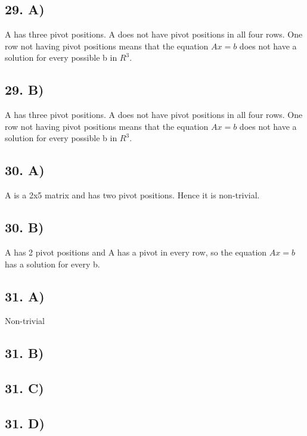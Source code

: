 \documentclass[12]{scrartcl}
\begin{document}
\subsection*{29. A)}
A has three pivot positions. A does not have pivot positions in all four rows. One row not having pivot positions means that the equation $Ax = b$ does not have a solution for every possible b in $R^3$.
\subsection*{29. B)}
A has three pivot positions. A does not have pivot positions in all four rows. One row not having pivot positions means that the equation $Ax = b$ does not have a solution for every possible b in $R^3$.
\subsection*{30. A)}
A is a 2x5 matrix and has two pivot positions. Hence it is non-trivial. 
\subsection*{30. B)}
A has 2 pivot positions and A has a pivot in every row, so the equation $Ax = b$ has a solution for every b. 
\subsection*{31. A)}
Non-trivial
\subsection*{31. B)}
\subsection*{31. C)}
\subsection*{31. D)}
\end{document}
